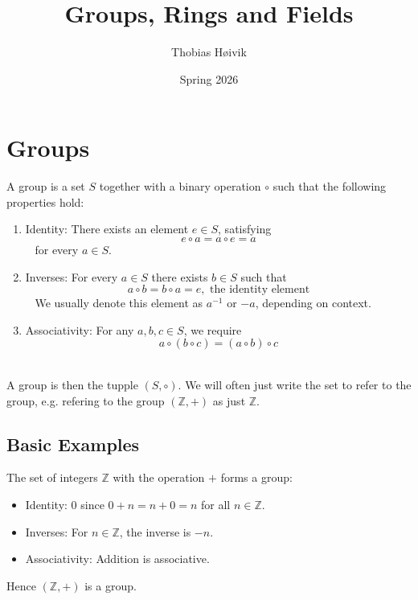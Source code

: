 
\usepackage{tikz-cd}
\hfuzz=5pt

\title{\huge{Groups, Rings and Fields}}
\author{\LARGE{Thobias Høivik}}
\date{\Large{Spring 2026}}


\maketitle

\newpage
\tableofcontents

\newpage
\section{Groups}

\begin{defn}[Group]
\label{defn:group}
A group is a set $S$ together with a binary operation 
$\circ$ such that the following properties hold: 

\begin{enumerate}
    \item Identity: There exists an element $e \in S$, satisfying
        $$ 
            e \circ a = a \circ e = a 
        $$ 
        for every $a \in S$.

    \item Inverses: For every $a \in S$ there exists $b \in S$ such 
        that 
        $$ 
            a \circ b = b \circ a = e, \text{ the identity element}
        $$ 
        We usually denote this element as $a^{-1}$ or $-a$, depending
        on context.

    \item Associativity: For any $a,b,c \in S$, we require 
        $$ 
            a \circ (b \circ c) = (a \circ b) \circ c
        $$ 
\end{enumerate}

A group is then the tupple $(S,\circ)$. We will often just write 
the set to refer to the group, e.g. refering to the group 
$(\mathbb Z, +)$ as just $\mathbb Z$.
    
\end{defn}

\subsection{Basic Examples}

\begin{ex}
The set of integers $\mathbb{Z}$ with the operation $+$ forms a group:
\begin{itemize}
    \item Identity: $0$ since $0 + n = n + 0 = n$ for all $n \in \mathbb{Z}$.
    \item Inverses: For $n \in \mathbb{Z}$, the inverse is $-n$.
    \item Associativity: Addition is associative.
\end{itemize}
Hence $(\mathbb{Z}, +)$ is a group.
\end{ex}

